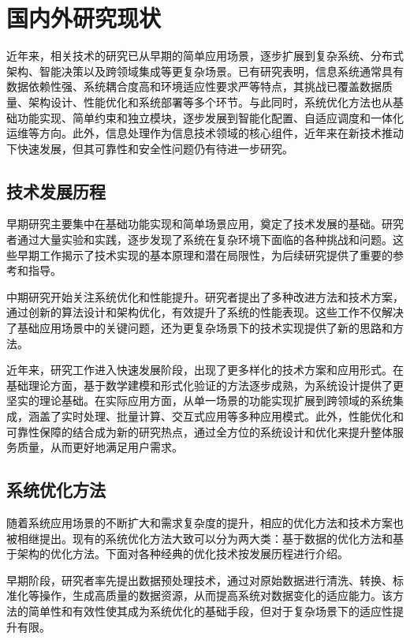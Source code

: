 \section{国内外研究现状}\label{ux56fdux5185ux5916ux7814ux7a76ux73b0ux72b6}

近年来，相关技术的研究已从早期的简单应用场景，逐步扩展到复杂系统、分布式架构、智能决策以及跨领域集成等更复杂场景。已有研究表明，信息系统通常具有数据依赖性强、系统耦合度高和环境适应性要求严等特点，其挑战已覆盖数据质量、架构设计、性能优化和系统部署等多个环节。与此同时，系统优化方法也从基础功能实现、简单约束和独立模块，逐步发展到智能化配置、自适应调度和一体化运维等方向。此外，信息处理作为信息技术领域的核心组件，近年来在新技术推动下快速发展，但其可靠性和安全性问题仍有待进一步研究。

\subsection{技术发展历程}\label{luxiangqianyan-jinzhan}

早期研究主要集中在基础功能实现和简单场景应用，奠定了技术发展的基础。研究者通过大量实验和实践，逐步发现了系统在复杂环境下面临的各种挑战和问题。这些早期工作揭示了技术实现的基本原理和潜在局限性，为后续研究提供了重要的参考和指导。

中期研究开始关注系统优化和性能提升。研究者提出了多种改进方法和技术方案，通过创新的算法设计和架构优化，有效提升了系统的性能表现。这些工作不仅解决了基础应用场景中的关键问题，还为更复杂场景下的技术实现提供了新的思路和方法。

近年来，研究工作进入快速发展阶段，出现了更多样化的技术方案和应用形式。在基础理论方面，基于数学建模和形式化验证的方法逐步成熟，为系统设计提供了更坚实的理论基础。在实际应用方面，从单一场景的功能实现扩展到跨领域的系统集成，涵盖了实时处理、批量计算、交互式应用等多种应用模式。此外，性能优化和可靠性保障的结合成为新的研究热点，通过全方位的系统设计和优化来提升整体服务质量，从而更好地满足用户需求。

\subsection{系统优化方法}\label{luxiangqianya-fangfa}

随着系统应用场景的不断扩大和需求复杂度的提升，相应的优化方法和技术方案也被相继提出。现有的系统优化方法大致可以分为两大类：基于数据的优化方法和基于架构的优化方法。下面对各种经典的优化技术按发展历程进行介绍。

早期阶段，研究者率先提出数据预处理技术\cite{ref7}，通过对原始数据进行清洗、转换、标准化等操作，生成高质量的数据资源，从而提高系统对数据变化的适应能力。该方法的简单性和有效性使其成为系统优化的基础手段，但对于复杂场景下的适应性提升有限。


